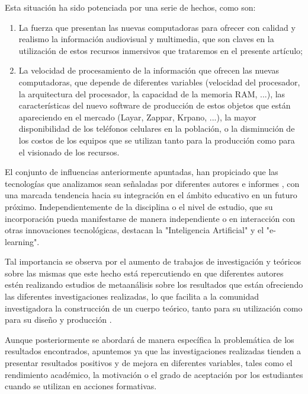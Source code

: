 \documentclass[spanish]{textolivre}
\begin{document}
Esta situación ha sido potenciada por una serie de hechos, como son: 

\begin{enumerate}
    \item La fuerza que presentan las nuevas computadoras para ofrecer con calidad y realismo la información audiovisual y multimedia, que son claves en la utilización de estos recursos inmersivos que trataremos en el presente artículo; 
    \item La velocidad de procesamiento de la información que ofrecen las nuevas computadoras, que depende de diferentes variables (velocidad del procesador, la arquitectura del procesador, la capacidad de la memoria RAM, ...), las características del nuevo software de producción de estos objetos que están apareciendo en el mercado (Layar, Zappar, Krpano, ...), la mayor disponibilidad de los teléfonos celulares en la población, o la disminución de los costos de los equipos que se utilizan tanto para la producción como para el visionado de los recursos.
\end{enumerate}

El conjunto de influencias anteriormente apuntadas, han propiciado que las tecnologías que analizamos sean señaladas por diferentes autores e informes \cite{brown_2020,joosten2020digital,kukulska-hulme2021innovating,pelletier2021educause}, con una marcada tendencia hacia su integración en el ámbito educativo en un futuro próximo. Independientemente de la disciplina o el nivel de estudio, que su incorporación pueda manifestarse de manera independiente o en interacción con otras innovaciones tecnológicas, destacan la "Inteligencia Artificial" y el "e-learning".

Tal importancia se observa por el aumento de trabajos de investigación y teóricos sobre las mismas que este hecho está repercutiendo en que diferentes autores estén realizando estudios de metaanálisis sobre los resultados que están ofreciendo las diferentes investigaciones realizadas, lo que facilita a la comunidad investigadora la construcción de un cuerpo teórico, tanto para su utilización como para su diseño y producción \cite{dinatale2020immersive,tang2020evaluating,howard2021meta,yu_2021,roda2022using,Zeeshan_2022,wang2023application}.

Aunque posteriormente se abordará de manera específica la problemática de los resultados encontrados, apuntemos ya que las investigaciones realizadas tienden a presentar resultados positivos y de mejora en diferentes variables, tales como el rendimiento académico, la motivación o el grado de aceptación por los estudiantes cuando se utilizan en acciones formativas. 
\end{document}
